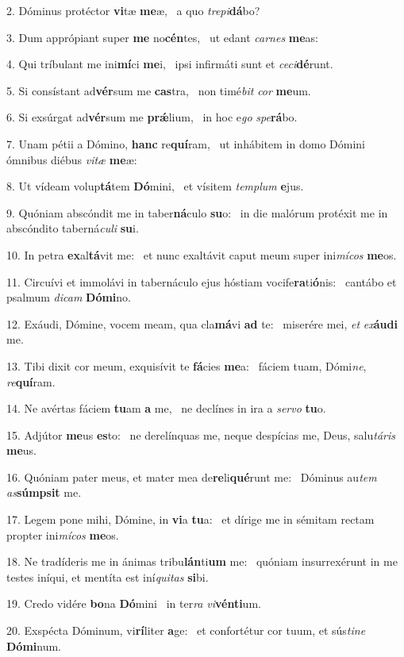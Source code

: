 2. Dóminus protéctor \textbf{vi}tæ \textbf{me}æ, \ast\  a quo \textit{tre}\textit{pi}\textbf{dá}bo?\

3. Dum apprópiant super \textbf{me} no\textbf{cén}tes, \ast\  ut edant \textit{car}\textit{nes} \textbf{me}as:\

4. Qui tríbulant me ini\textbf{mí}ci \textbf{me}i, \ast\  ipsi infirmáti sunt et \textit{ce}\textit{ci}\textbf{dé}runt.\

5. Si consístant ad\textbf{vér}sum me \textbf{cas}tra, \ast\  non timé\textit{bit} \textit{cor} \textbf{me}um.\

6. Si exsúrgat ad\textbf{vér}sum me \textbf{prǽ}lium, \ast\  in hoc e\textit{go} \textit{spe}\textbf{rá}bo.\

7. Unam pétii a Dómino, \textbf{hanc} re\textbf{quí}ram, \ast\  ut inhábitem in domo Dómini ómnibus diébus \textit{vi}\textit{tæ} \textbf{me}æ:\

8. Ut vídeam volup\textbf{tá}tem \textbf{Dó}mini, \ast\  et vísitem \textit{tem}\textit{plum} \textbf{e}jus.\

9. Quóniam abscóndit me in taber\textbf{ná}culo \textbf{su}o: \ast\  in die malórum protéxit me in abscóndito taberná\textit{cu}\textit{li} \textbf{su}i.\

10. In petra \textbf{ex}al\textbf{tá}vit me: \ast\  et nunc exaltávit caput meum super ini\textit{mí}\textit{cos} \textbf{me}os.\

11. Circuívi et immolávi in tabernáculo ejus hóstiam vocife\textbf{ra}ti\textbf{ó}nis: \ast\  cantábo et psalmum \textit{di}\textit{cam} \textbf{Dó}\textbf{mi}no.\

12. Exáudi, Dómine, vocem meam, qua cla\textbf{má}vi \textbf{ad} te: \ast\  miserére mei, \textit{et} \textit{ex}\textbf{áu}\textbf{di} me.\

13. Tibi dixit cor meum, exquisívit te \textbf{fá}cies \textbf{me}a: \ast\  fáciem tuam, Dómi\textit{ne}, \textit{re}\textbf{quí}ram.\

14. Ne avértas fáciem \textbf{tu}am \textbf{a} me, \ast\  ne declínes in ira a \textit{ser}\textit{vo} \textbf{tu}o.\

15. Adjútor \textbf{me}us \textbf{es}to: \ast\  ne derelínquas me, neque despícias me, Deus, salu\textit{tá}\textit{ris} \textbf{me}us.\

16. Quóniam pater meus, et mater mea de\textbf{re}li\textbf{qué}runt me: \ast\  Dóminus au\textit{tem} \textit{as}\textbf{súmp}\textbf{sit} me.\

17. Legem pone mihi, Dómine, in \textbf{vi}a \textbf{tu}a: \ast\  et dírige me in sémitam rectam propter ini\textit{mí}\textit{cos} \textbf{me}os.\

18. Ne tradíderis me in ánimas tribu\textbf{lán}ti\textbf{um} me: \ast\  quóniam insurrexérunt in me testes iníqui, et mentíta est iní\textit{qui}\textit{tas} \textbf{si}bi.\

19. Credo vidére \textbf{bo}na \textbf{Dó}mini \ast\  in ter\textit{ra} \textit{vi}\textbf{vén}\textbf{ti}um.\

20. Exspécta Dóminum, vi\textbf{rí}liter \textbf{a}ge: \ast\  et confortétur cor tuum, et sús\textit{ti}\textit{ne} \textbf{Dó}\textbf{mi}num.\

